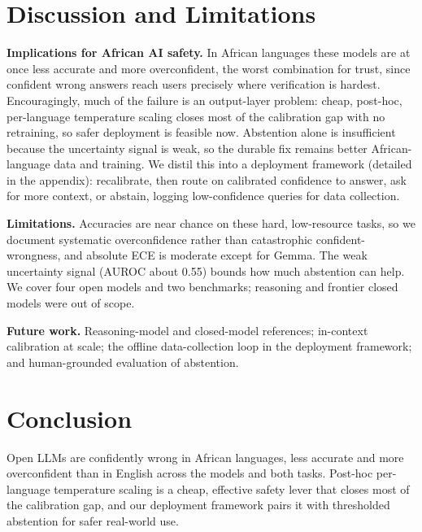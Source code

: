 \documentclass[pmlr]{jmlr}%
\begin{document}
\section{Discussion and Limitations}
\textbf{Implications for African AI safety.} In African languages these models are at once less
accurate and more overconfident, the worst combination for trust, since confident wrong answers
reach users precisely where verification is hardest. Encouragingly, much of the failure is an
output-layer problem: cheap, post-hoc, per-language temperature scaling closes most of the
calibration gap with no retraining, so safer deployment is feasible now. Abstention alone is
insufficient because the uncertainty signal is weak, so the durable fix remains better
African-language data and training. We distil this into a deployment framework (detailed in the
appendix): recalibrate, then route on calibrated confidence to answer, ask for more context, or
abstain, logging low-confidence queries for data collection.

\textbf{Limitations.} Accuracies are near chance on these hard, low-resource tasks, so we document
systematic overconfidence rather than catastrophic confident-wrongness, and absolute ECE is moderate
except for Gemma. The weak uncertainty signal (AUROC about 0.55) bounds how much abstention can help.
We cover four open models and two benchmarks; reasoning and frontier closed models were out of scope.

\textbf{Future work.} Reasoning-model and closed-model references; in-context calibration at scale;
the offline data-collection loop in the deployment framework; and human-grounded evaluation of
abstention.

\section{Conclusion}
Open LLMs are confidently wrong in African languages, less accurate and more overconfident than in
English across the models and both tasks. Post-hoc per-language temperature scaling is a cheap,
effective safety lever that closes most of the calibration gap, and our deployment framework pairs it
with thresholded abstention for safer real-world use.
\end{document}
